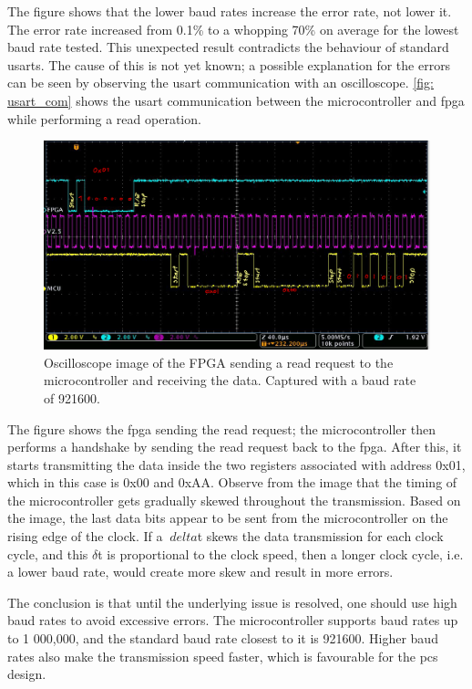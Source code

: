 \documentclass[main.tex]{subfiles}
\begin{document}
The figure shows that the lower baud rates increase the error rate, not lower it. The error rate increased from 0.1\% to a whopping 70\% on average for the lowest baud rate tested. This unexpected result contradicts the behaviour of standard \gls{usart}s. The cause of this is not yet known; a possible explanation for the errors can be seen by observing the \gls{usart} communication with an oscilloscope. \autoref{fig: usart_com} shows the \gls{usart} communication between the microcontroller and \gls{fpga} while performing a read operation.

\begin{figure}[!ht]
    \centering
    \includegraphics[width=18cm]{images/USARTTransaction.png}
    \caption{Oscilloscope image of the FPGA sending a read request to the microcontroller and receiving the data. Captured with a baud rate of 921600.}
    \label{fig: usart_com}
\end{figure}
\FloatBarrier

The figure shows the \gls{fpga} sending the read request; the microcontroller then performs a handshake by sending the read request back to the \gls{fpga}. After this, it starts transmitting the data inside the two registers associated with address 0x01, which in this case is 0x00 and 0xAA. Observe from the image that the timing of the microcontroller gets gradually skewed throughout the transmission. Based on the image, the last data bits appear to be sent from the microcontroller on the rising edge of the clock. If a $\ delta$t skews the data transmission for each clock cycle, and this $\delta$t is proportional to the clock speed, then a longer clock cycle, i.e. a lower baud rate, would create more skew and result in more errors.

The conclusion is that until the underlying issue is resolved, one should use high baud rates to avoid excessive errors. The microcontroller supports baud rates up to 1 000,000, and the standard baud rate closest to it is 921600. Higher baud rates also make the transmission speed faster, which is favourable for the \gls{pcs} design.
\end{document}
